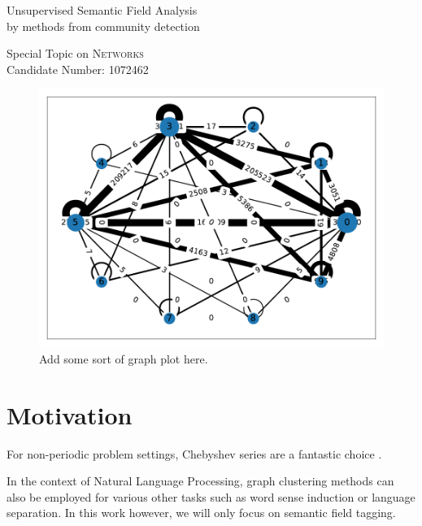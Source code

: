 \documentclass[12pt, a4paper]{article}
\title{\topictitle}
\author{Candidate \candidatenumber}
\date{\today}
\newcommand{\chebyshev}{Chebyshev\xspace}
\newcommand{\topictitle}{Unsupervised Semantic Field Analysis \\ \large by methods from community detection}
\newcommand{\candidatenumber}{1072462}
\newcommand{\course}{Networks}
\begin{document}
  \pagestyle{plain}
  \begin{center}
    \vspace*{-2.5cm}
    \Large \topictitle \\
    \vspace{.3cm}

    \normalsize Special Topic on \textcolor{themecolor3}{\textsc{\course}}\\
    \normalsize Candidate Number: \textcolor{themecolor3}{\candidatenumber}
    \vspace{.3cm}
  \end{center}

  \begin{abstract}
    \label{abstract}
    This work will attempt to
  \end{abstract}

  \begin{figure}[H]
    \centering
    \includegraphics[width=0.9\linewidth]{figures/H-4-louvain.pdf}
    \caption{Add some sort of graph plot here.}
  \end{figure}

  \pagebreak
  \pagestyle{normal}

  \tableofcontents
  \pagebreak

  \section{Motivation}
  For non-periodic problem settings, \chebyshev series are a fantastic choice \parencite{cw-biemann}.

  In the context of Natural Language Processing, graph clustering methods can also be employed for various other tasks such as word sense induction or language separation.
  In this work however, we will only focus on semantic field tagging.
\end{document}
